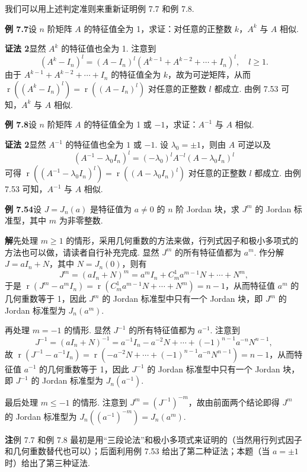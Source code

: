 \documentclass[UTF8, 12pt, fontset=fandol, oneside]{ctexart}
\begin{document}
我们可以用上述判定准则来重新证明例 7.7 和例 7.8.

\noindent\textbf{例 7.7}\quad 设 $n$ 阶矩阵 $A$ 的特征值全为 1，求证：对任意的正整数 $k$，$A^k$ 与 $A$ 相似.

\noindent\textbf{证法 2}\quad 显然 $A^k$ 的特征值也全为 1. 注意到
\[
(A^k-I_n)^l=(A-I_n)^l(A^{k-1}+A^{k-2}+\cdots+I_n)^l,\quad l\ge 1.
\]
由于 $A^{k-1}+A^{k-2}+\cdots+I_n$ 的特征值全为 $k$，故为可逆矩阵，从而 $\operatorname{r}((A^k-I_n)^l)=\operatorname{r}((A-I_n)^l)$ 对任意的正整数 $l$ 都成立. 由例 7.53 可知，$A^k$ 与 $A$ 相似.

\noindent\textbf{例 7.8}\quad 设 $n$ 阶矩阵 $A$ 的特征值全为 1 或 $-1$，求证：$A^{-1}$ 与 $A$ 相似.

\noindent\textbf{证法 2}\quad 显然 $A^{-1}$ 的特征值也全为 $1$ 或 $-1$. 设 $\lambda_0=\pm 1$，则由 $A$ 可逆以及
\[
(A^{-1}-\lambda_0I_n)^l=(-\lambda_0)^lA^{-l}(A-\lambda_0I_n)^l
\]
可得 $\operatorname{r}((A^{-1}-\lambda_0I_n)^l)=\operatorname{r}((A-\lambda_0I_n)^l)$ 对任意的正整数 $l$ 都成立. 由例 7.53 可知，$A^{-1}$ 与 $A$ 相似.

\noindent\textbf{例 7.54}\quad 设 $J=J_n(a)$ 是特征值为 $a\ne 0$ 的 $n$ 阶 Jordan 块，求 $J^m$ 的 Jordan 标准型，其中 $m$ 为非零整数.

\noindent\textbf{解}\quad 先处理 $m\ge 1$ 的情形，采用几何重数的方法来做，行列式因子和极小多项式的方法也可以做，请读者自行补充完成. 显然 $J^m$ 的所有特征值都为 $a^m$. 作分解 $J=aI_n+N$，其中 $N=J_n(0)$，则有
\[
J^m=(aI_n+N)^m=a^mI_n+C_m^1a^{m-1}N+\cdots+N^m,
\]
于是 $\operatorname{r}(J^m-a^mI_n)=\operatorname{r}(C_m^1a^{m-1}N+\cdots+N^m)=n-1$，从而特征值 $a^m$ 的几何重数等于 1，因此 $J^m$ 的 Jordan 标准型中只有一个 Jordan 块，即 $J^m$ 的 Jordan 标准型为 $J_n(a^m)$.

再处理 $m=-1$ 的情形. 显然 $J^{-1}$ 的所有特征值都为 $a^{-1}$. 注意到
\[
J^{-1}=(aI_n+N)^{-1}=a^{-1}I_n-a^{-2}N+\cdots+(-1)^{n-1}a^{-n}N^{n-1},
\]
故 $\operatorname{r}(J^{-1}-a^{-1}I_n)=\operatorname{r}(-a^{-2}N+\cdots+(-1)^{n-1}a^{-n}N^{n-1})=n-1$，从而特征值 $a^{-1}$ 的几何重数等于 1，因此 $J^{-1}$ 的 Jordan 标准型中只有一个 Jordan 块，即 $J^{-1}$ 的 Jordan 标准型为 $J_n(a^{-1})$.

最后处理 $m\le -1$ 的情形. 注意到 $J^m=(J^{-1})^{-m}$，故由前面两个结论即得 $J^m$ 的 Jordan 标准型为 $J_n((a^{-1})^{-m})=J_n(a^m)$.

\noindent\textbf{注}\quad 例 7.7 和例 7.8 最初是用“三段论法”和极小多项式来证明的（当然用行列式因子和几何重数替代也可以）；后面利用例 7.53 给出了第二种证法；本题（当 $a=\pm1$ 时）给出了第三种证法.
\end{document}
